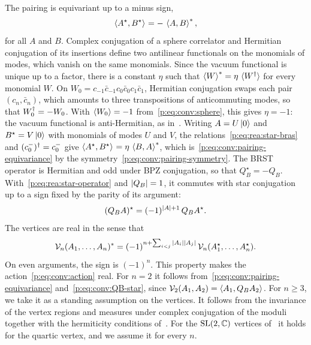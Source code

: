 The pairing is equivariant up to a minus sign,
\begin{equation}
  \label{p:eq:conv:pairing-equivariance}
  \braket{A^\star, B^\star}_{}
    = - \, \braket{A, B}_{}^*,
\end{equation}
for all $A$ and $B$.
Complex conjugation of a sphere correlator and Hermitian conjugation of its insertions define two antilinear functionals on the monomials of modes, which vanish on the same monomials.
  Since the vacuum functional is unique up to a factor, there is a constant $\eta$ such that $\braket{W}^* = \eta \, \braket{{W^\dagger}}$ for every monomial $W$.
  On $W_0 = c_{-1} \bar c_{-1} c_0 \bar c_0 c_1 \bar c_1$, Hermitian conjugation swaps each pair $(c_n, \bar c_n)$, which amounts to three transpositions of anticommuting modes, so that ${W_0^\dagger} = - W_0$.
  With $\braket{W_0} = - 1$ from~\eqref{p:eq:conv:sphere}, this gives $\eta = - 1$: the vacuum functional is anti-Hermitian, as in~\cite[eq.~(2.37)]{Zwiebach:1993:ClosedStringField}.
  Writing $A = U \ket{0}$ and $B^\star = V \ket{0}$ with monomials of modes $U$ and $V$, the relations~\eqref{p:eq:rea:star-bras} and ${(c_0^-)^\dagger} = c_0^-$ give $\braket{A^\star, B^\star}_{} = \eta \, \braket{B, A}_{}^*$, which is~\eqref{p:eq:conv:pairing-equivariance} by the symmetry~\eqref{p:eq:conv:pairing-symmetry}.
The BRST operator is Hermitian and odd under BPZ conjugation, so that $Q_B^\star = - Q_B$.
  With~\eqref{p:eq:rea:star-operator} and ${|Q_B|} = 1$, it commutes with star conjugation up to a sign fixed by the parity of its argument:
\begin{equation}
  \label{p:eq:conv:QB-star}
  (Q_B A)^\star
    = (-1)^{{|A|} + 1} \, Q_B A^\star.
\end{equation}
The vertices are real in the sense that
\begin{equation}
  \label{p:eq:conv:vertex-reality}
  \mathcal{V}_{n}(A_1, \ldots, A_n)^*
    = (-1)^{n + \sum_{i < j} {|A_i|} {|A_j|}} \, \mathcal{V}_{n}(A_1^\star, \ldots, A_n^\star).
\end{equation}
On even arguments, the sign is $(-1)^n$.
  This property makes the action~\eqref{p:eq:conv:action} real.
For $n = 2$ it follows from~\eqref{p:eq:conv:pairing-equivariance} and~\eqref{p:eq:conv:QB-star}, since $\mathcal{V}_{2}(A_1, A_2) = \braket{A_1, Q_B A_2}_{}$.
For $n \ge 3$, we take it as a standing assumption on the vertices.
It follows from the invariance of the vertex regions and measures under complex conjugation of the moduli together with the hermiticity conditions of~\cite[sec.~5.1 and eq.~(7.98)]{Zwiebach:1993:ClosedStringField}.
For the $\mathrm{SL}(2, \mathbb{C})$ vertices of~\cite{Erbin:2026:SL2CVerticesClosed} it holds for the quartic vertex, and we assume it for every $n$.

